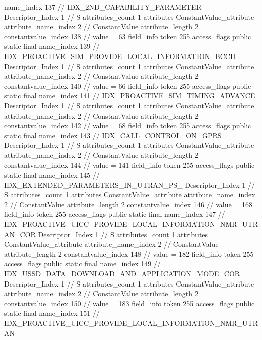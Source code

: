 {{{{{				name_index	137		// IDX_2ND_CAPABILITY_PARAMETER
				Descriptor_Index	1		// S
				attributes_count	1
				attributes {
				ConstantValue_attribute {
					attribute_name_index	2		// ConstantValue
					attribute_length	2
					constantvalue_index	138		// value = 63
				}
				}
			}
			field_info {
				token	255
				access_flags	public static final
				name_index	139		// IDX_PROACTIVE_SIM_PROVIDE_LOCAL_INFORMATION_BCCH
				Descriptor_Index	1		// S
				attributes_count	1
				attributes {
				ConstantValue_attribute {
					attribute_name_index	2		// ConstantValue
					attribute_length	2
					constantvalue_index	140		// value = 66
				}
				}
			}
			field_info {
				token	255
				access_flags	public static final
				name_index	141		// IDX_PROACTIVE_SIM_TIMING_ADVANCE
				Descriptor_Index	1		// S
				attributes_count	1
				attributes {
				ConstantValue_attribute {
					attribute_name_index	2		// ConstantValue
					attribute_length	2
					constantvalue_index	142		// value = 68
				}
				}
			}
			field_info {
				token	255
				access_flags	public static final
				name_index	143		// IDX_CALL_CONTROL_ON_GPRS
				Descriptor_Index	1		// S
				attributes_count	1
				attributes {
				ConstantValue_attribute {
					attribute_name_index	2		// ConstantValue
					attribute_length	2
					constantvalue_index	144		// value = 141
				}
				}
			}
			field_info {
				token	255
				access_flags	public static final
				name_index	145		// IDX_EXTENDED_PARAMETERS_IN_UTRAN_PS_
				Descriptor_Index	1		// S
				attributes_count	1
				attributes {
				ConstantValue_attribute {
					attribute_name_index	2		// ConstantValue
					attribute_length	2
					constantvalue_index	146		// value = 168
				}
				}
			}
			field_info {
				token	255
				access_flags	public static final
				name_index	147		// IDX_PROACTIVE_UICC_PROVIDE_LOCAL_INFORMATION_NMR_UTRAN_COR
				Descriptor_Index	1		// S
				attributes_count	1
				attributes {
				ConstantValue_attribute {
					attribute_name_index	2		// ConstantValue
					attribute_length	2
					constantvalue_index	148		// value = 182
				}
				}
			}
			field_info {
				token	255
				access_flags	public static final
				name_index	149		// IDX_USSD_DATA_DOWNLOAD_AND_APPLICATION_MODE_COR
				Descriptor_Index	1		// S
				attributes_count	1
				attributes {
				ConstantValue_attribute {
					attribute_name_index	2		// ConstantValue
					attribute_length	2
					constantvalue_index	150		// value = 183
				}
				}
			}
			field_info {
				token	255
				access_flags	public static final
				name_index	151		// IDX_PROACTIVE_UICC_PROVIDE_LOCAL_INFORMATION_NMR_UTRAN
}}}}}
